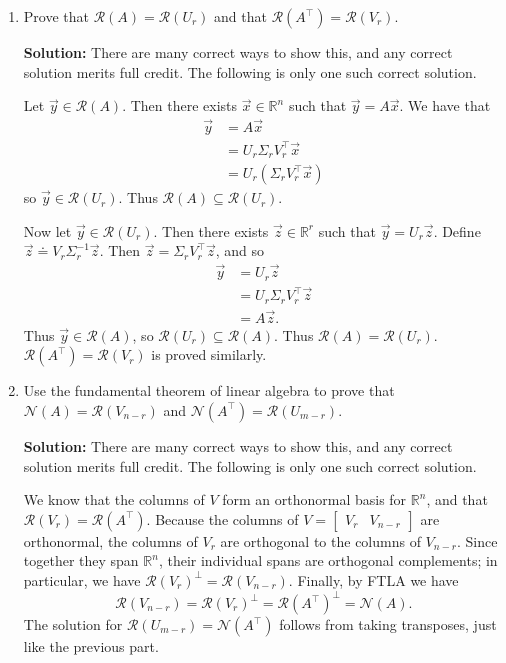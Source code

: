 \documentclass[10pt]{article}
\theoremstyle{definition}
\theoremstyle{plain}
\newcommand{\RR}{\mathbb{R}}
\newcommand{\NN}{\mathcal{N}}
\newcommand{\Range}{\mathcal{R}}
\begin{document}
\begin{enumerate}[label=(\alph*)]
\item Prove that $\Range(A) = \Range(U_r)$ and that $\Range\!\left(A^\top\right) = \Range(V_r)$.

\textbf{Solution:} There are many correct ways to show this, and any correct solution merits full credit. The following is only one such correct solution.

Let $\vec{y} \in \Range(A)$. Then there exists $\vec{x} \in \RR^n$ such that $\vec{y} = A\vec{x}$. We have that
\begin{align}
\vec{y} &= A\vec{x} \\
&= U_r \Sigma_r V_r^\top \vec{x} \\
&= U_r (\Sigma_r V_r^\top \vec{x})
\end{align}
so $\vec{y} \in \Range(U_r)$. Thus $\Range(A) \subseteq \Range(U_r)$.

Now let $\vec{y} \in \Range(U_r)$. Then there exists $\vec{z} \in \RR^r$ such that $\vec{y} = U_r \vec{z}$. Define $\vec{z} \doteq V_r \Sigma_r^{-1} \vec{z}$. Then $\vec{z} = \Sigma_r V_r^\top \vec{z}$, and so
\begin{align}
\vec{y} &= U_r \vec{z} \\
&= U_r \Sigma_r V_r^\top \vec{z} \\
&= A\vec{z}.
\end{align}
Thus $\vec{y} \in \Range(A)$, so $\Range(U_r) \subseteq \Range(A)$. Thus $\Range(A) = \Range(U_r)$. $\Range\!\left(A^\top\right) = \Range(V_r)$ is proved similarly.

\item Use the fundamental theorem of linear algebra to prove that $\NN(A) = \Range(V_{n-r})$ and $\NN\!\left(A^\top\right) = \Range(U_{m-r})$.

\textbf{Solution:} There are many correct ways to show this, and any correct solution merits full credit. The following is only one such correct solution.

We know that the columns of $V$ form an orthonormal basis for $\RR^n$, and that $\Range(V_r) = \Range\!\left(A^\top\right)$. Because the columns of $V = \begin{bmatrix} V_r & V_{n-r} \end{bmatrix}$ are orthonormal, the columns of $V_r$ are orthogonal to the columns of $V_{n-r}$. Since together they span $\RR^n$, their individual spans are orthogonal complements; in particular, we have $\Range(V_r)^\perp = \Range(V_{n-r})$. Finally, by FTLA we have
\begin{equation}
\Range(V_{n-r}) = \Range(V_r)^\perp = \Range\!\left(A^\top\right)^\perp = \NN(A).
\end{equation}
The solution for $\Range(U_{m-r}) = \NN\!\left(A^\top\right)$ follows from taking transposes, just like the previous part.
\end{enumerate}
\end{document}
